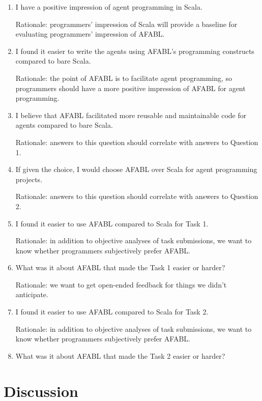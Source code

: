 \begin{enumerate}
\item I have a positive impression of agent programming in Scala.

Rationale: programmers’ impression of Scala will provide a baseline for evaluating
programmers’ impression of AFABL.

\item I found it easier to write the agents using AFABL’s programming constructs compared to bare Scala.

Rationale: the point of AFABL is to facilitate agent programming, so programmers should have a more positive impression of AFABL for agent programming.

\item I believe that AFABL facilitated more reusable and maintainable code for agents compared to bare Scala.

Rationale: answers to this question should correlate with answers to Question 1.

\item If given the choice, I would choose AFABL over Scala for agent programming projects.

Rationale: answers to this question should correlate with answers to Question 2.

\item I found it easier to use AFABL compared to Scala for Task 1.

  Rationale: in addition to objective analyses of task submissions, we want to know whether programmers subjectively prefer AFABL.

\item What was it about AFABL that made the Task 1 easier or harder?

Rationale: we want to get open-ended feedback for things we didn’t anticipate.

\item I found it easier to use AFABL compared to Scala for Task 2.

Rationale: in addition to objective analyses of task submissions, we want to know whether programmers subjectively prefer AFABL.

\item What was it about AFABL that made the Task 2 easier or harder?

\end{enumerate}

\section{Discussion}

